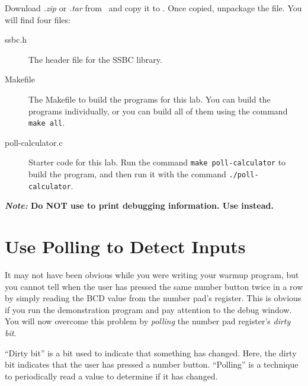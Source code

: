 Download \textit{\shortlabname.zip} or \textit{\shortlabname.tar} from
\filesource\ and copy it to \runtimeenvironment. Once copied, unpackage the
file. You will find four files:
\begin{description}
    \item [ssbc.h] The header file for the SSBC library.
    \item [Makefile] The Makefile to build the programs for this lab. You can build the programs individually, or you can build all of them using the command \texttt{make all}.
    \item [poll-calculator.c] Starter code for this lab. Run the
        command \texttt{make poll-calculator} to build the program, and then
        run it with the command \texttt{./poll-calculator}.
\end{description}

\textbf{\textit{Note: }Do NOT use  to print debugging
information. Use  instead.}

\section{Use Polling to Detect Inputs}

It may not have been obvious while you were writing your warmup program, but
you cannot tell when the user has pressed the same number button twice in a
row by simply reading the BCD value from the number pad's register. This is
obvious if you run the demonstration program and pay attention to the debug
window. You will now overcome this problem by \textit{polling} the number pad
register's \textit{dirty bit}.

``Dirty bit'' is a bit used to indicate that something has changed. Here, the
dirty bit indicates that the user has pressed a number button. ``Polling'' is a
technique to periodically read a value to determine if it has changed.

